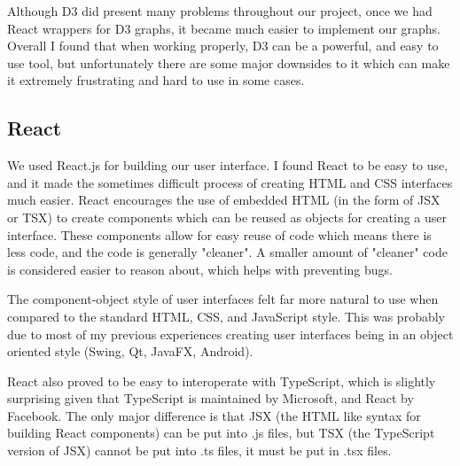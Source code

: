 \documentclass[10pt, journal]{IEEEtran}
\begin{document}
Although D3 did present many problems throughout our project, once we had React wrappers for D3 graphs, it became much easier to implement our graphs. Overall I found that when working properly, D3 can be a powerful, and easy to use tool, but unfortunately there are some major downsides to it which can make it extremely frustrating and hard to use in some cases. 

\subsection{React}
We used React.js \cite{react} for building our user interface. I found React to be easy to use, and it made the sometimes difficult process of creating HTML and CSS interfaces much easier. React encourages the use of embedded HTML (in the form of JSX or TSX) to create components which can be reused as objects for creating a user interface. These components allow for easy reuse of code which means there is less code, and the code is generally "cleaner". A smaller amount of "cleaner" code is considered easier to reason about, which helps with preventing bugs. 

The component-object style of user interfaces felt far more natural to use when compared to the standard HTML, CSS, and JavaScript style. This was probably due to most of my previous experiences creating user interfaces being in an object oriented style (Swing, Qt, JavaFX, Android). 

React also proved to be easy to interoperate with TypeScript, which is slightly surprising given that TypeScript is maintained by Microsoft, and React by Facebook. The only major difference is that JSX (the HTML like syntax for building React components) can be put into .js files, but TSX (the TypeScript version of JSX) cannot be put into .ts files, it must be put in .tsx files.
\end{document}

